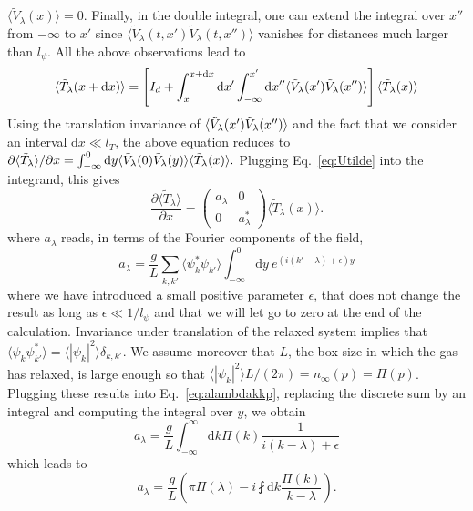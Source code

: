 \documentclass[submission,Phys,10pt]{SciPost}%
\begin{document}
$\langle \tilde V_\lambda(x)\rangle =0$. Finally, in the double integral, 
one can
 extend the integral over $x''$ from $-\infty$ to $x'$ since  $\langle \tilde V_\lambda(t,x')\tilde V_\lambda(t,x'')\rangle$ vanishes for distances much larger than $l_\psi$. 
All the above observations lead to 
\begin{eqnarray}
\langle \Tilde{T}_{\lambda}(x+\mathrm{d}x) \rangle= \left [ I_d+\int_{x}^{x+\mathrm{d}x}\mathrm{d}x' \int_{-\infty}^{x'}\mathrm{d}x'' \langle \Tilde{V}_{\lambda}(x')\Tilde{V}_{\lambda}(x'')\rangle \right ] \langle \Tilde{T}_{\lambda}(x)\rangle
\label{equ:d}
\end{eqnarray}
Using the translation invariance of 
$\langle \Tilde{V}_{\lambda}(x')\Tilde{V}_{\lambda}(x'')\rangle$ and  the fact that we consider an interval $\mathrm{d}x\ll l_T$, the above equation reduces to 
$\partial \langle  \tilde{T}_\lambda\rangle / \partial x =\int_{-\infty}^0 \mathrm{d} y \langle \Tilde{V}_{\lambda}(0)\Tilde{V}_{\lambda}(y)\rangle   \langle \tilde{T}_\lambda(x)\rangle . $
Plugging Eq.~\ref{eq:Utilde} into the integrand, this gives 
\begin{equation}
    \frac{\partial \langle  \tilde{T}_\lambda\rangle }{\partial x }=\begin{pmatrix} a_\lambda & 0 \\ 0 & a_\lambda^*\end{pmatrix}
    \langle  \tilde{T}_\lambda(x)\rangle .   
    \label{eq:evolTtildemoy}
\end{equation}
where  $a_\lambda$ reads, in terms of the Fourier components of the field, 
\begin{equation}
a_{\lambda} = \frac{g}{L}\sum_{k,k'} \langle \psi_{k}^*\psi_{k'}\rangle \int_{-\infty}^{0}\mathrm{d}y~e^{(i(k'-\lambda)+\epsilon) y}
\label{eq:alambdakkp}
\end{equation}
where we have introduced a small positive parameter $\epsilon$, that does not change the result as long as $\epsilon \ll 1/l_\psi$ and that we will let go to zero at the end of the calculation.
Invariance under translation of the relaxed system implies that  $\langle \psi_k\psi_{k'}^*\rangle = \langle |\psi_k|^2\rangle \delta_{k,k'}$. 
We assume moreover that $L$, the box size in which the gas has relaxed, is large enough so that $\langle |\psi_k|^2\rangle L /(2\pi)= n_\infty(p)= \Pi(p)$. 
Plugging  these results into Eq.~\eqref{eq:alambdakkp}, replacing the discrete sum by an integral and computing the integral over $y$, we obtain
\begin{equation}
a_{\lambda} =\frac{g}{L}\int_{-\infty}^\infty \mathrm{d}k \Pi(k) %
\frac{1}{i(k-\lambda)+\epsilon}
\label{eq:alambdaint}
\end{equation} 
which leads to
 \begin{equation}
a_{\lambda}=\frac{g}{L}\left ( \pi \Pi(\lambda) - i \fint \mathrm{d}k \frac{\Pi(k)}{k-\lambda} \right ) .
\label{eq:alambda_fin}
\end{equation}
\end{document}
